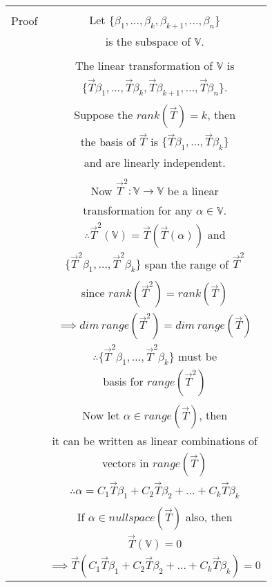 \documentclass[journal,12pt,twocolumn]{IEEEtran}
\begin{document}
\begin{table}[h!]
\begin{center}
\begin{tabular}{|c|c|}
\hline
& \\
Proof & Let $\lbrace \beta_1,\ldots,\beta_k,\beta_{k+1},\ldots,\beta_n \rbrace$\\
& is the subspace of $\mathbb{V}$.\\
& \\
& The linear transformation of $\mathbb{V}$ is\\
& $\lbrace \vec{T}\beta_1,\ldots,\vec{T}\beta_k,\vec{T}\beta_{k+1},\ldots,\vec{T}\beta_n \rbrace$.\\
& \\
& Suppose the $rank (\vec{T}) = k$, then \\
& the basis of $\vec{T}$ is $\lbrace \vec{T}\beta_1,\ldots,\vec{T}\beta_k \rbrace$ \\
& and are linearly independent.\\
& \\
& Now $\vec{T}^2 : \mathbb{V} \rightarrow \mathbb{V}$ be a linear \\
& transformation for any $\alpha \in \mathbb{V}$.\\
& $\therefore \vec{T}^2(\mathbb{V}) = \vec{T}(\vec{T}(\alpha))$ and \\
& $\lbrace \vec{T}^2\beta_1,\ldots,\vec{T}^2\beta_k \rbrace$ span the range of $\vec{T}^2$\\
& \\
& since $ rank (\vec{T}^2) = rank (\vec{T})$\\
& $\implies dim \  range (\vec{T}^2) = dim \  range (\vec{T})$\\
& $\therefore \lbrace \vec{T}^2\beta_1,\ldots,\vec{T}^2\beta_k \rbrace$ must be\\
& basis for $range(\vec{T}^2)$\\
& \\
& Now let $\alpha \in range(\vec{T})$, then\\
& it can be written as linear combinations of \\
& vectors in $ range(\vec{T})$\\
& $\therefore \alpha = C_1\vec{T}\beta_1+C_2\vec{T}\beta_2+\ldots+C_k\vec{T}\beta_k$\\
& \\
& If $\alpha \in null space (\vec{T})$ also, then\\
& $ \vec{T}(\mathbb{V}) = 0$\\
& $\implies \vec{T}(C_1\vec{T}\beta_1+C_2\vec{T}\beta_2+\ldots+C_k\vec{T}\beta_k) = 0$\\

\end{tabular}
\end{center}
\end{table}
\end{document}
